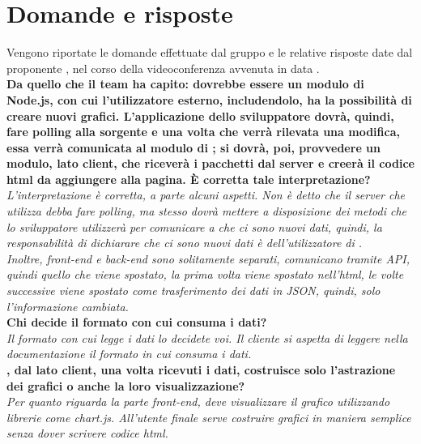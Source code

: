 
\section{Domande e risposte}
Vengono riportate le domande effettuate dal gruppo \groupname{} e le relative risposte date dal proponente \proponente{}, nel corso della videoconferenza avvenuta in data .\\
	
	\textbf{Da quello che il team ha capito: \projectname{} dovrebbe essere un modulo di Node.js, con cui l'utilizzatore esterno, includendolo, ha la possibilità di creare nuovi grafici. L'applicazione dello sviluppatore dovrà, quindi, fare polling alla sorgente e una volta che verrà rilevata una modifica, essa verrà comunicata al modulo di \projectname{}; si dovrà, poi, provvedere un modulo, lato client, che riceverà i pacchetti dal server e creerà il codice html da aggiungere alla pagina. \`{E} corretta tale interpretazione?}\\
	\textit{L'interpretazione è corretta, a parte alcuni aspetti. Non è detto che il server che utilizza \projectname{} debba fare polling, ma \projectname{} stesso dovrà mettere a disposizione dei metodi che lo sviluppatore utilizzerà per comunicare a \projectname{} che ci sono nuovi dati, quindi, la responsabilità di dichiarare che ci sono nuovi dati è dell'utilizzatore di \projectname{}.\\
	Inoltre, front-end e back-end sono solitamente separati, comunicano tramite API, quindi quello che viene spostato, la prima volta viene spostato nell'html, le volte successive viene spostato come trasferimento dei dati in JSON, quindi, solo l'informazione cambiata.}\\
	
	\textbf{Chi decide il formato con cui \projectname{} consuma i dati?}\\
	\textit{Il formato con cui \projectname{} legge i dati lo decidete voi. Il cliente si aspetta di leggere nella documentazione il formato in cui \projectname{} consuma i dati.}\\
	
	\textbf{\projectname{}, dal lato client, una volta ricevuti i dati, costruisce solo l'astrazione dei grafici o anche la loro visualizzazione?}\\
	\textit{Per quanto riguarda la parte front-end, \projectname{} deve visualizzare il grafico utilizzando librerie come chart.js. All'utente finale serve costruire grafici in maniera semplice senza dover scrivere codice html.}\\
	
